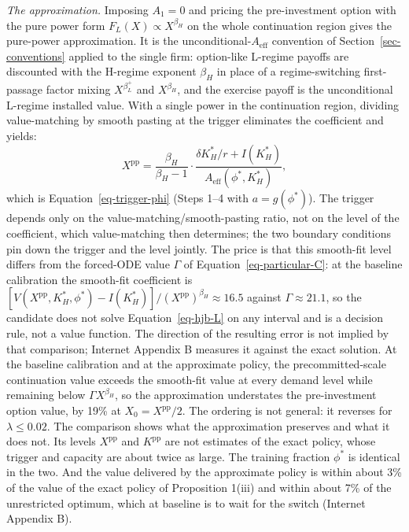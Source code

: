 \documentclass[
  11pt,
  letterpaper,
]{scrartcl}
\begin{document}
\emph{The approximation.} Imposing \(A_1 = 0\) and pricing the
pre-investment option with the pure power form
\(F_L(X) \propto X^{\beta_H}\) on the whole continuation region gives
the pure-power approximation. It is the unconditional-\(A_{\text{eff}}\)
convention of Section~\ref{sec-conventions} applied to the single firm:
option-like L-regime payoffs are discounted with the H-regime exponent
\(\beta_H\) in place of a regime-switching first-passage factor mixing
\(X^{\beta_L^+}\) and \(X^{\beta_H}\), and the exercise payoff is the
unconditional L-regime installed value. With a single power in the
continuation region, dividing value-matching by smooth pasting at the
trigger eliminates the coefficient and yields: \[
X^{\text{pp}} = \frac{\beta_H}{\beta_H - 1} \cdot \frac{\delta K_H^*/r + I(K_H^*)}{A_{\text{eff}}(\phi^*, K_H^*)},
\] which is Equation~\ref{eq-trigger-phi} (Steps 1--4 with
\(a = g(\phi^*)\)). The trigger depends only on the
value-matching/smooth-pasting ratio, not on the level of the
coefficient, which value-matching then determines; the two boundary
conditions pin down the trigger and the level jointly. The price is that
this smooth-fit level differs from the forced-ODE value \(\Gamma\) of
Equation~\ref{eq-particular-C}: at the baseline calibration the
smooth-fit coefficient is
\([V(X^{\text{pp}}, K_H^*, \phi^*) - I(K_H^*)]/(X^{\text{pp}})^{\beta_H} \approx 16.5\)
against \(\Gamma \approx 21.1\), so the candidate does not solve
Equation~\ref{eq-hjb-L} on any interval and is a decision rule, not a
value function. The direction of the resulting error is not implied by
that comparison; Internet Appendix B measures it against the exact
solution. At the baseline calibration and at the approximate policy, the
precommitted-scale continuation value exceeds the smooth-fit value at
every demand level while remaining below \(\Gamma X^{\beta_H}\), so the
approximation understates the pre-investment option value, by 19\% at
\(X_0 = X^{\text{pp}}/2\). The ordering is not general: it reverses for
\(\lambda \leq 0.02\). The comparison shows what the approximation
preserves and what it does not. Its levels \(X^{\text{pp}}\) and
\(K^{\text{pp}}\) are not estimates of the exact policy, whose trigger
and capacity are about twice as large. The training fraction \(\phi^*\)
is identical in the two. And the value delivered by the approximate
policy is within about 3\% of the value of the exact policy of
Proposition 1(iii) and within about 7\% of the unrestricted optimum,
which at baseline is to wait for the switch (Internet Appendix B).
\end{document}
